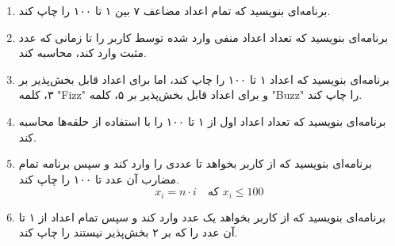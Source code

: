 \documentclass[a4paper,12pt]{article}
\begin{document}
\begin{enumerate}
		\item برنامه‌ای بنویسید که تمام اعداد مضاعف ۷ بین ۱ تا ۱۰۰ را چاپ کند.
		
		\item برنامه‌ای بنویسید که تعداد اعداد منفی وارد شده توسط کاربر را تا زمانی که عدد مثبت وارد کند، محاسبه کند.
		
		\item برنامه‌ای بنویسید که اعداد ۱ تا ۱۰۰ را چاپ کند، اما برای اعداد قابل بخش‌پذیر بر ۳، کلمه "Fizz" و برای اعداد قابل بخش‌پذیر بر ۵، کلمه "Buzz" را چاپ کند.
		
		\item برنامه‌ای بنویسید که تعداد اعداد اول از ۱ تا ۱۰۰ را با استفاده از حلقه‌ها محاسبه کند.
		
		\item برنامه‌ای بنویسید که از کاربر بخواهد تا عددی را وارد کند و سپس برنامه تمام مضارب آن عدد تا ۱۰۰ را چاپ کند.
		\[
		x_i = n \cdot i \quad \text{که } x_i \leq 100
		\]
		
		\item برنامه‌ای بنویسید که از کاربر بخواهد یک عدد وارد کند و سپس تمام اعداد از ۱ تا آن عدد را که بر ۲ بخش‌پذیر نیستند را چاپ کند.
		
	\end{enumerate}
	
	
	
	\newpage
\end{document}
